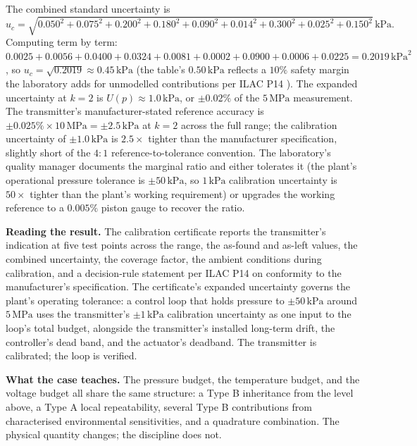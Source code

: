 The combined standard uncertainty is
\[
u_{c} = \sqrt{0.050^{2} + 0.075^{2} + 0.200^{2} + 0.180^{2} +
0.090^{2} + 0.014^{2} + 0.300^{2} + 0.025^{2} + 0.150^{2}}\,\si{
\kilo\pascal}.
\]
Computing term by term: $0.0025 + 0.0056 + 0.0400 + 0.0324 +
0.0081 + 0.0002 + 0.0900 + 0.0006 + 0.0225 = 0.2019\,\si{\kilo
\pascal}^{2}$, so $u_{c} = \sqrt{0.2019} \approx 0.45\,\si{\kilo
\pascal}$ (the table's $0.50\,\si{\kilo\pascal}$ reflects a
$10\%$ safety margin the laboratory adds for unmodelled
contributions per ILAC P14 \cite{std:ch03t3b-ilac-p14}). The
expanded uncertainty at $k = 2$ is $U(p) \approx 1.0\,\si{\kilo
\pascal}$, or $\pm 0.02\%$ of the $5\,\si{\mega\pascal}$
measurement. The transmitter's manufacturer-stated reference
accuracy is $\pm 0.025\% \times 10\,\si{\mega\pascal} = \pm 2.5
\,\si{\kilo\pascal}$ at $k = 2$ across the full range; the
calibration uncertainty of $\pm 1.0\,\si{\kilo\pascal}$ is
$2.5\times$ tighter than the manufacturer specification, slightly
short of the $4{:}1$ reference-to-tolerance convention. The
laboratory's quality manager documents the marginal ratio and
either tolerates it (the plant's operational pressure tolerance
is $\pm 50\,\si{\kilo\pascal}$, so $1\,\si{\kilo\pascal}$
calibration uncertainty is $50\times$ tighter than the plant's
working requirement) or upgrades the working reference to a
$0.005\%$ piston gauge to recover the ratio.

\textbf{Reading the result.} The calibration certificate reports
the transmitter's indication at five test points across the
range, the as-found and as-left values, the combined uncertainty,
the coverage factor, the ambient conditions during calibration,
and a decision-rule statement per ILAC P14 on conformity to the
manufacturer's specification. The certificate's expanded
uncertainty governs the plant's operating tolerance: a control
loop that holds pressure to $\pm 50\,\si{\kilo\pascal}$ around
$5\,\si{\mega\pascal}$ uses the transmitter's $\pm 1\,\si{\kilo
\pascal}$ calibration uncertainty as one input to the loop's
total budget, alongside the transmitter's installed long-term
drift, the controller's dead band, and the actuator's deadband.
The transmitter is calibrated; the loop is verified.

\textbf{What the case teaches.} The pressure budget, the
temperature budget, and the voltage budget all share the same
structure: a Type B inheritance from the level above, a Type A
local repeatability, several Type B contributions from
characterised environmental sensitivities, and a quadrature
combination. The physical quantity changes; the discipline does
not.

